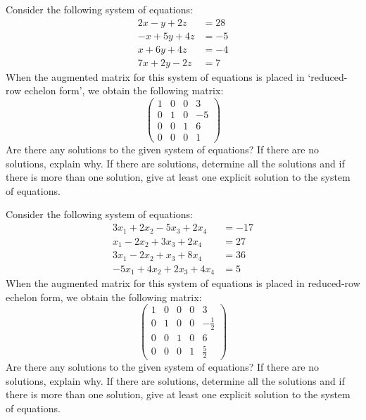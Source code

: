 \documentclass[12pt,letterpaper]{exam}
\begin{document}
\begin{questions}



\newpage
\question[10] Consider the following system of equations:
	\[
	\begin{aligned}
	2x - y + 2z&= 28 \\
	-x + 5y + 4z&= -5 \\
	x + 6y + 4z&= -4 \\
	7x + 2y - 2z&= 7
	\end{aligned}
	\]
When the augmented matrix for this system of equations is placed in `reduced-row echelon form', we obtain the following matrix:
	\[
	\begin{pmatrix}
	1 & 0 & 0 & 3 \\
	0 & 1 & 0 & -5 \\
	0 & 0 & 1 & 6 \\
	0 & 0 & 0 & 1
	\end{pmatrix}	
	\]
Are there any solutions to the given system of equations? If there are no solutions, explain why. If there are solutions, determine all the solutions and if there is more than one solution, give at least one explicit solution to the system of equations.  



\newpage
\question[10] Consider the following system of equations:
	\[
	\begin{aligned}
	3x_1 + 2x_2 - 5x_3 + 2x_4&= -17 \\
	x_1 - 2x_2 + 3x_3 + 2x_4&= 27 \\
	3x_1 - 2x_2 + x_3 + 8x_4&= 36 \\
	-5x_1 + 4x_2 + 2x_3 + 4x_4&= 5
	\end{aligned}
	\]
When the augmented matrix for this system of equations is placed in reduced-row echelon form, we obtain the following matrix:
	\[
	\begin{pmatrix}
	1 & 0 & 0 & 0 & 3 \\
	0 & 1 & 0 & 0 & -\frac{1}{2} \\
	0 & 0 & 1 & 0 & 6 \\
	0 & 0 & 0 & 1 & \frac{5}{2}
	\end{pmatrix}	
	\]
Are there any solutions to the given system of equations? If there are no solutions, explain why. If there are solutions, determine all the solutions and if there is more than one solution, give at least one explicit solution to the system of equations.  




\end{questions}
\end{document}
